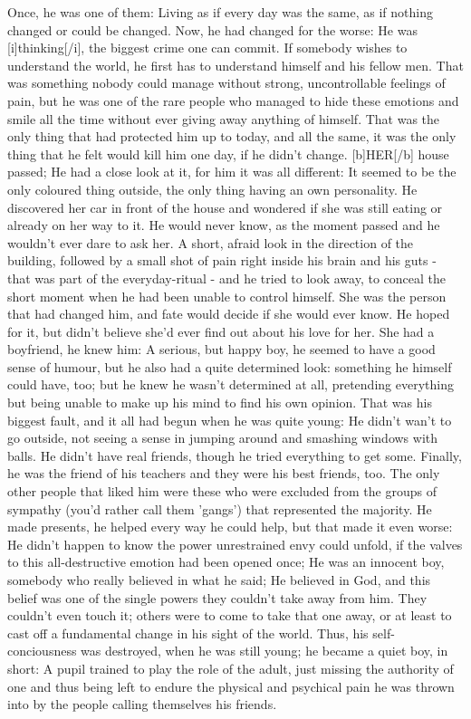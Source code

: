 Once, he was one of them: Living as if every day was the same, as if nothing changed or could be changed. Now, he had changed for the worse: He was [i]thinking[/i], the biggest crime one can commit. If somebody wishes to understand the world, he first has to understand himself and his fellow men. That was something nobody could manage without strong, uncontrollable feelings of pain, but he was one of the rare people who managed to hide these emotions and smile all the time without ever giving away anything of himself. That was the only thing that had protected him up to today, and all the same, it was the only thing that he felt would kill him one day, if he didn't change. [b]HER[/b] house passed; He had a close look at it, for him it was all different: It seemed to be the only coloured thing outside, the only thing having an own personality. He discovered her car in front of the house and wondered if she was still eating or already on her way to it. He would never know, as the moment passed and he wouldn't ever dare to ask her. A short, afraid look in the direction of the building, followed by a small shot of pain right inside his brain and his guts - that was part of the everyday-ritual - and he tried to look away, to conceal the short moment when he had been unable to control himself. She was the person that had changed him, and fate would decide if she would ever know. He hoped for it, but didn't believe she'd ever find out about his love for her. She had a boyfriend, he knew him: A serious, but happy boy, he seemed to have a good sense of humour, but he also had a quite determined look: something he himself could have, too; but he knew he wasn't determined at all, pretending everything but being unable to make up his mind to find his own opinion. That was his biggest fault, and it all had begun when he was quite young: He didn't wan't to go outside, not seeing a sense in jumping around and smashing windows with balls. He didn't have real friends, though he tried everything to get some. Finally, he was the friend of his teachers and they were his best friends, too. The only other people that liked him were these who were excluded from the groups of sympathy (you'd rather call them 'gangs') that represented the majority. He made presents, he helped every way he could help, but that made it even worse: He didn't happen to know the power unrestrained envy could unfold, if the valves to this all-destructive emotion had been opened once; He was an innocent boy, somebody who really believed in what he said; He believed in God, and this belief was one of the single powers they couldn't take away from him. They couldn't even touch it; others were to come to take that one away, or at least to cast off a fundamental change in his sight of the world. Thus, his self-conciousness was destroyed, when he was still young; he became a quiet boy, in short: A pupil trained to play the role of the adult, just missing the authority of one and thus being left to endure the physical and psychical pain he was thrown into by the people calling themselves his friends. 
